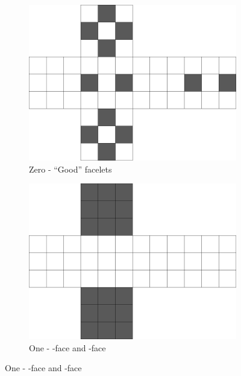 \documentclass{report}
\newcommand{\face}[1]{\uppercase{\texttt{\formatmovesnospace{#1}}}-face}
\begin{document}
	\begin{figure}[H]
		\centering
		\begin{subfigure}[b]{0.275\textwidth}
			\includegraphics[width=\textwidth]{Resources/Images/dwgMonochrome0.png}
			\caption{Zero - \enquote{Good} facelets}
			\label{fig:dwgMonochrome0}
		\end{subfigure}
		\hspace{10mm}
		\begin{subfigure}[b]{0.275\textwidth}
			\includegraphics[width=\textwidth]{Resources/Images/dwgMonochrome1.png}
			\caption{One - \face{U} and \face{D}}
			\label{fig:dwgMonochrome1}
		\end{subfigure}
		\hspace{10mm}

\end{figure}
\end{document}
